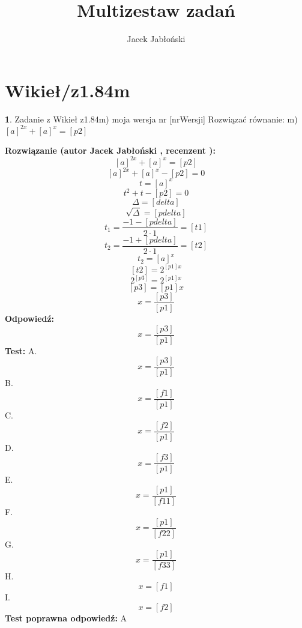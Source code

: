 \documentclass[12pt, a4paper]{article}
\title{Multizestaw zadań}
\author{Jacek Jabłoński}
\date{}
\theoremstyle{definition} %
\newtheorem{zad}{}
\newcommand{\kategoria}[1]{\section{#1}} %
\newcommand{\zadStart}[1]{\begin{zad}#1\newline} %
\newcommand{\zadStop}{\end{zad}}   %
\newcommand{\rozwStart}[2]{\noindent \textbf{Rozwiązanie (autor #1 , recenzent #2): }\newline} %
\newcommand{\rozwStop}{\newline}                                            %
\newcommand{\odpStart}{\noindent \textbf{Odpowiedź:}\newline}    %
\newcommand{\odpStop}{\newline}                                             %
\newcommand{\testStart}{\noindent \textbf{Test:}\newline} %
\newcommand{\testStop}{\newline} %
\newcommand{\kluczStart}{\noindent \textbf{Test poprawna odpowiedź:}\newline} %
\newcommand{\kluczStop}{\newline} %
\begin{document}
\maketitle


\kategoria{Wikieł/z1.84m}
\zadStart{Zadanie z Wikieł z1.84m) moja wersja nr [nrWersji]}
Rozwiązać równanie:
m) $[a]^{2x} + [a]^x = [p2]$
\zadStop
\rozwStart{Jacek Jabłoński}{}
$$[a]^{2x} + [a]^x = [p2]$$
$$[a]^{2x} + [a]^x - [p2] = 0$$
$$t = [a]^x$$
$$t^2 + t - [p2] = 0 $$
$$\Delta = [delta]$$
$$\sqrt{\Delta} = [pdelta]$$
$$t_1 = \frac{-1-[pdelta]}{2 \cdot 1} = [t1]$$
$$t_2 = \frac{-1+[pdelta]}{2 \cdot 1} =[t2]$$
$$t_2 = [a]^x $$
$$[t2] = 2^{[p1]x} $$
$$2^[p3]=2^{[p1]x}$$
$$[p3]=[p1]x$$
$$x=\frac{[p3]}{[p1]}$$
\rozwStop
\odpStart
$$ x=\frac{[p3]}{[p1]} $$
\odpStop
\testStart
A. $$ x=\frac{[p3]}{[p1]} $$
B. $$ x=\frac{[f1]}{[p1]} $$
C. $$ x=\frac{[f2]}{[p1]} $$
D. $$ x=\frac{[f3]}{[p1]} $$
E. $$ x=\frac{[p1]}{[f11]} $$
F. $$ x=\frac{[p1]}{[f22]} $$
G. $$ x=\frac{[p1]}{[f33]} $$
H. $$ x=[f1] $$
I. $$ x=[f2] $$
\testStop
\kluczStart
A
\kluczStop
\end{document}
